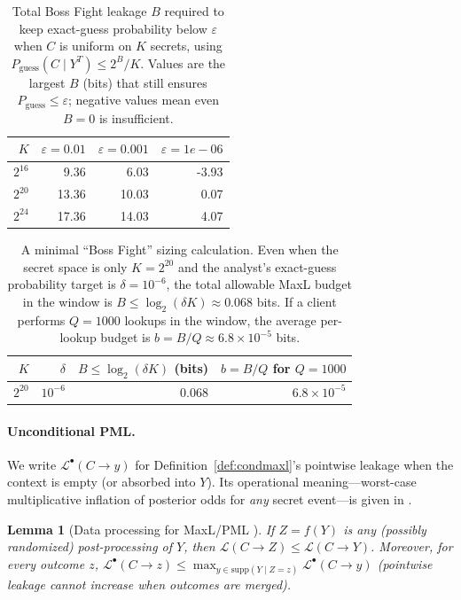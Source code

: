 \documentclass[11pt]{article}
\newcommand{\supp}{\mathrm{supp}}
\newcommand{\MaxL}{\mathcal{L}}
\newcommand{\PML}{\mathcal{L}^{\bullet}}
\newcommand{\logtwo}{\log_2}
\newtheorem{lemma}{Lemma}
\begin{document}
\begin{table}[t]
\centering
\caption{Total Boss Fight leakage $B$ required to keep exact-guess probability below $\varepsilon$ when $C$ is uniform on $K$ secrets, using $P_{\mathrm{guess}}(C\mid Y^{T})\le 2^{B}/K$. Values are the largest $B$ (bits) that still ensures $P_{\mathrm{guess}}\le \varepsilon$; negative values mean even $B=0$ is insufficient.}
\label{tab:identification-targets}
\begin{tabular}{r r r r}
\toprule
$K$ & $\varepsilon=0.01$ & $\varepsilon=0.001$ & $\varepsilon=1e-06$\\
\midrule
$2^{16}$ & 9.36 & 6.03 & -3.93 \\
$2^{20}$ & 13.36 & 10.03 & 0.07 \\
$2^{24}$ & 17.36 & 14.03 & 4.07 \\
\bottomrule
\end{tabular}
\end{table}


\begin{table}[t]
\centering
\caption{A minimal ``Boss Fight'' sizing calculation. Even when the secret space is only $K=2^{20}$ and the analyst's exact-guess probability target is $\delta=10^{-6}$, the total allowable MaxL budget in the window is $B\le \logtwo(\delta K)\approx 0.068$ bits. If a client performs $Q=1000$ lookups in the window, the average per-lookup budget is $b=B/Q\approx 6.8\times 10^{-5}$ bits.}
\label{tab:window-example}
\begin{tabular}{rrrr}
\toprule
$K$ & $\delta$ & $B\le \logtwo(\delta K)$ (bits) & $b=B/Q$ for $Q{=}1000$ \\
\midrule
$2^{20}$ & $10^{-6}$ & $0.068$ & $6.8\times 10^{-5}$ \\
\bottomrule
\end{tabular}
\end{table}




\paragraph{Unconditional PML.}
We write $\PML(C\!\to\!y)$ for Definition~\ref{def:condmaxl}'s pointwise leakage when the context is empty (or absorbed into $Y$). Its operational meaning---worst-case multiplicative inflation of posterior odds for \emph{any} secret event---is given in \cite{saeidian2023pml,saeidian2025rethinking}.

\begin{lemma}[Data processing for MaxL/PML \cite{issa2020operational,saeidian2023pml}]\label{lem:dp}
If $Z=f(Y)$ is any (possibly randomized) post-processing of $Y$, then
$\MaxL(C\!\to\!Z)\le \MaxL(C\!\to\!Y)$.
Moreover, for every outcome $z$, $\PML(C\!\to\!z)\le \max_{y\in\supp(Y\mid Z=z)} \PML(C\!\to\!y)$ (pointwise leakage cannot increase when outcomes are merged).
\end{lemma}
\end{document}
